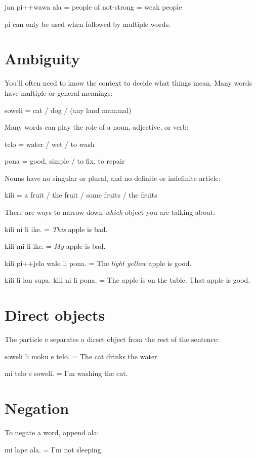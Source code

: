 \documentclass{article}
\begin{document}
\begin{multicols}{2}
\begin{ex}
  {\tpf jan pi++wawa ala} = people of not-strong = weak people
\end{ex}

{\tpf pi} can only be used when followed by multiple words.

\section*{Ambiguity}
You’ll often need to know the context to decide what
things mean.  Many words have multiple or general meanings:
\begin{ex}
  {\tpf soweli} = cat / dog / (any land mammal)
\end{ex}

Many words can play the role of a noun, adjective, or verb: 
\begin{ex}
  {\tpf telo} = water / wet / to wash

  {\tpf pona} = good, simple / to fix, to repair
\end{ex}

Nouns have no singular or plural, and no definite or
indefinite article:
\begin{ex}
  {\tpf kili} = a fruit / the fruit / some fruits / the fruits
\end{ex}

There are ways to narrow down \textit{which} object
you are talking about:
\begin{ex}
  {\tpf kili ni li ike}. = \textit{This} apple is bad.

  {\tpf kili mi li ike}. = \textit{My} apple is bad.

  {\tpf kili pi++jelo walo li pona}. = The \textit{light yellow}
  apple is good.

  {\tpf kili li lon supa.  kili ni li pona.} =
  The apple is on the table.  That apple is good.
\end{ex}

\section*{Direct objects}
The particle {\tpf e} separates a direct object from
the rest of the sentence:
\begin{ex}
  {\tpf soweli li moku e telo.} = The cat drinks the water.

  {\tpf mi telo e soweli.} = I’m washing the cat. 
\end{ex}

\section*{Negation}
To negate a word, append {\tpf ala}:
\begin{ex}
  {\tpf mi lape ala.} = I'm not sleeping.


\end{ex}
\end{multicols}
\end{document}
